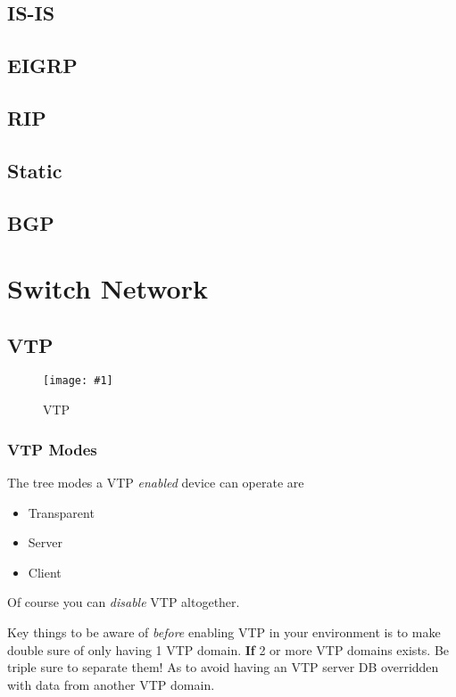 \documentclass[a4paper,12pt,twoside,twocolumn]{book}
\newcommand{\fig}[3]{
\begin{figure}[h]
    \centering
    \texttt{[image: \#1]}
    \caption{#3}
    \label{fig:#2}
\end{figure}
}
\begin{document}
\subsection{IS-IS}
\subsection{EIGRP}
\subsection{RIP}
\subsection{Static}
\subsection{BGP}

\newpage

\section{Switch Network}

\subsection{VTP}
\fig{vtp/implementing-vtp}{imp-vtp1}{VTP}

\subsubsection{VTP Modes}
The tree modes a VTP \textit{enabled} device can operate are
\begin{itemize}
    \item Transparent
    \item Server
    \item Client
\end{itemize}
Of course you can \textit{disable} VTP altogether.

Key things to be aware of \textit{before} enabling VTP in your environment is to make double sure of only having 1 VTP domain. \textbf{If} 2 or more VTP domains exists. Be triple sure to separate them! As to avoid having an VTP server DB overridden with data from another VTP domain.
\end{document}
